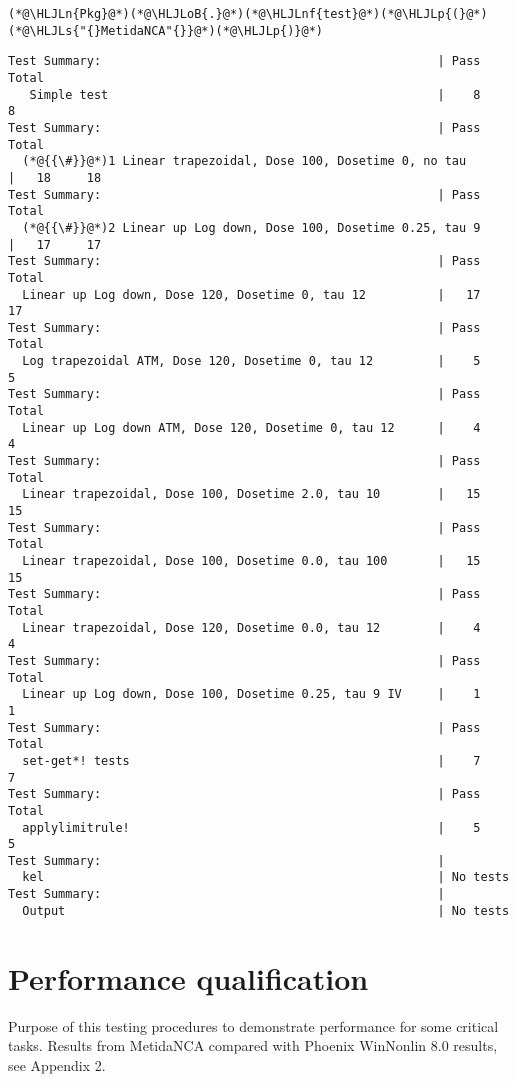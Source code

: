\documentclass[12pt,a4paper]{article}
\newcommand{\HLJLn}[1]{#1}
\newcommand{\HLJLnf}[1]{\textcolor[RGB]{66,102,213}{#1}}
\newcommand{\HLJLs}[1]{\textcolor[RGB]{201,61,57}{#1}}
\newcommand{\HLJLoB}[1]{\textcolor[RGB]{102,102,102}{\textbf{#1}}}
\newcommand{\HLJLp}[1]{#1}
\begin{document}
\begin{lstlisting}
(*@\HLJLn{Pkg}@*)(*@\HLJLoB{.}@*)(*@\HLJLnf{test}@*)(*@\HLJLp{(}@*)(*@\HLJLs{"{}MetidaNCA"{}}@*)(*@\HLJLp{)}@*)
\end{lstlisting}

\begin{lstlisting}
Test Summary:                                               | Pass  Total
   Simple test                                              |    8      8
Test Summary:                                               | Pass  Total
  (*@{{\#}}@*)1 Linear trapezoidal, Dose 100, Dosetime 0, no tau       |   18     18
Test Summary:                                               | Pass  Total
  (*@{{\#}}@*)2 Linear up Log down, Dose 100, Dosetime 0.25, tau 9     |   17     17
Test Summary:                                               | Pass  Total
  Linear up Log down, Dose 120, Dosetime 0, tau 12          |   17     17
Test Summary:                                               | Pass  Total
  Log trapezoidal ATM, Dose 120, Dosetime 0, tau 12         |    5      5
Test Summary:                                               | Pass  Total
  Linear up Log down ATM, Dose 120, Dosetime 0, tau 12      |    4      4
Test Summary:                                               | Pass  Total
  Linear trapezoidal, Dose 100, Dosetime 2.0, tau 10        |   15     15
Test Summary:                                               | Pass  Total
  Linear trapezoidal, Dose 100, Dosetime 0.0, tau 100       |   15     15
Test Summary:                                               | Pass  Total
  Linear trapezoidal, Dose 120, Dosetime 0.0, tau 12        |    4      4
Test Summary:                                               | Pass  Total
  Linear up Log down, Dose 100, Dosetime 0.25, tau 9 IV     |    1      1
Test Summary:                                               | Pass  Total
  set-get*! tests                                           |    7      7
Test Summary:                                               | Pass  Total
  applylimitrule!                                           |    5      5
Test Summary:                                               |
  kel                                                       | No tests
Test Summary:                                               |
  Output                                                    | No tests
\end{lstlisting}


\section{Performance qualification}
Purpose of this testing procedures to demonstrate performance for some critical tasks. Results from MetidaNCA compared with Phoenix WinNonlin 8.0 results, see Appendix 2.
\end{document}
